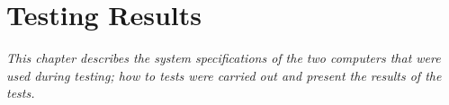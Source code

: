 \chapter{Testing Results} \label{chap:results}
\textit{This chapter describes the system specifications of the two computers that were used during testing; how to tests were carried out and present the results of the tests.}







